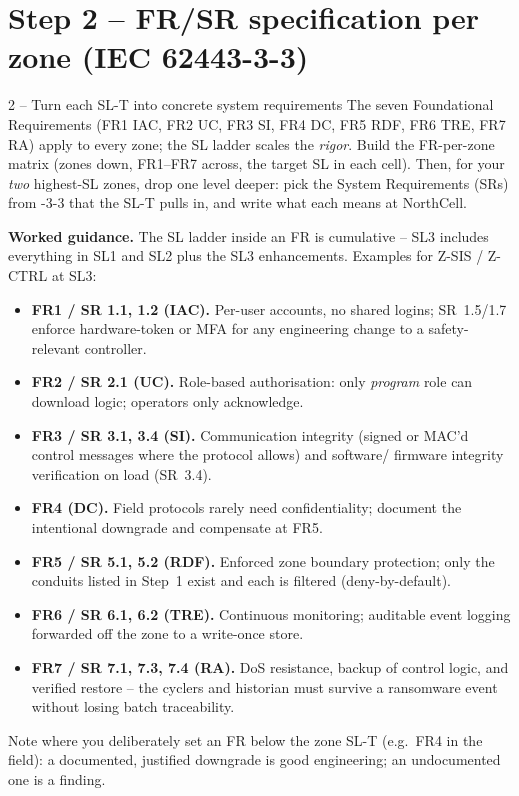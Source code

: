 \documentclass[11pt,a4paper]{article}
\begin{document}
\section*{Step 2 -- FR/SR specification per zone (IEC 62443-3-3)}

\begin{stepbox}{2 -- Turn each SL-T into concrete system requirements}
The seven Foundational Requirements (FR1 IAC, FR2 UC, FR3 SI, FR4 DC,
FR5 RDF, FR6 TRE, FR7 RA) apply to every zone; the SL ladder scales the
\emph{rigor}. Build the FR-per-zone matrix (zones down, FR1--FR7 across,
the target SL in each cell). Then, for your \emph{two} highest-SL zones,
drop one level deeper: pick the System Requirements (SRs) from -3-3 that
the SL-T pulls in, and write what each means at NorthCell.

\medskip
\noindent\textbf{Worked guidance.} The SL ladder inside an FR is
cumulative -- SL3 includes everything in SL1 and SL2 plus the SL3
enhancements. Examples for Z-SIS / Z-CTRL at SL3:
\begin{itemize}\setlength{\itemsep}{1pt}
  \item \textbf{FR1 / SR 1.1, 1.2 (IAC).} Per-user accounts, no shared
    logins; SR~1.5/1.7 enforce hardware-token or MFA for any engineering
    change to a safety-relevant controller.
  \item \textbf{FR2 / SR 2.1 (UC).} Role-based authorisation: only
    \emph{program} role can download logic; operators only acknowledge.
  \item \textbf{FR3 / SR 3.1, 3.4 (SI).} Communication integrity (signed
    or MAC'd control messages where the protocol allows) and software/
    firmware integrity verification on load (SR~3.4).
  \item \textbf{FR4 (DC).} Field protocols rarely need confidentiality;
    document the intentional downgrade and compensate at FR5.
  \item \textbf{FR5 / SR 5.1, 5.2 (RDF).} Enforced zone boundary
    protection; only the conduits listed in Step~1 exist and each is
    filtered (deny-by-default).
  \item \textbf{FR6 / SR 6.1, 6.2 (TRE).} Continuous monitoring;
    auditable event logging forwarded off the zone to a write-once store.
  \item \textbf{FR7 / SR 7.1, 7.3, 7.4 (RA).} DoS resistance, backup
    of control logic, and verified restore -- the cyclers and historian
    must survive a ransomware event without losing batch traceability.
\end{itemize}
Note where you deliberately set an FR below the zone SL-T (e.g.\ FR4 in
the field): a documented, justified downgrade is good engineering; an
undocumented one is a finding.
\end{stepbox}
\end{document}
